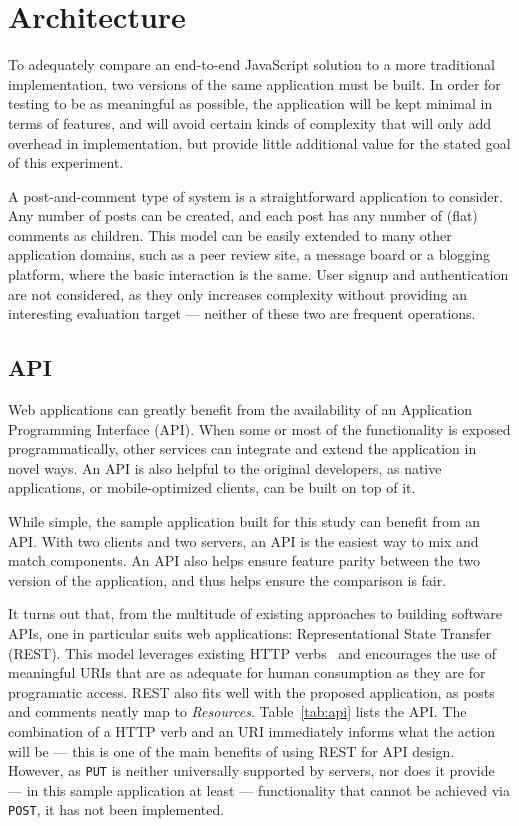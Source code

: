 \section{\label{sec:arch}Architecture}

To adequately compare an end-to-end JavaScript solution to a more traditional implementation, two versions of the same application must be built. In order for testing to be as meaningful as possible, the application will be kept minimal in terms of features, and will avoid certain kinds of complexity that will only add overhead in implementation, but provide little additional value for the stated goal of this experiment.

A post-and-comment type of system is a straightforward application to consider. Any number of posts can be created, and each post has any number of (flat) comments as children. This model can be easily extended to many other application domains, such as a peer review site, a message board or a blogging platform, where the basic interaction is the same. User signup and authentication are not considered, as they only increases complexity without providing an interesting evaluation target --- neither of these two are frequent operations.

\subsection{\label{sec:arch:API}API}

Web applications can greatly benefit from the availability of an Application Programming Interface (API). When some or most of the functionality is exposed programmatically, other services can integrate and extend the application in novel ways. An API is also helpful to the original developers, as native applications, or mobile-optimized clients, can be built on top of it.

While simple, the sample application built for this study can benefit from an API. With two clients and two servers, an API is the easiest way to mix and match components. An API also helps ensure feature parity between the two version of the application, and thus helps ensure the comparison is fair.

It turns out that, from the multitude of existing approaches to building software APIs, one in particular suits web applications: Representational State Transfer~\cite{restful} (REST). This model leverages existing HTTP verbs~\cite{rfc2616} and encourages the use of meaningful URIs that are as adequate for human consumption as they are for programatic access. REST also fits well with the proposed application, as posts and comments neatly map to \emph{Resources}. Table~\ref{tab:api} lists the API. The combination of a HTTP verb and an URI immediately informs what the action will be --- this is one of the main benefits of using REST for API design. However, as \texttt{PUT} is neither universally supported by servers, nor does it provide --- in this sample application at least --- functionality that cannot be achieved via \texttt{POST}, it has not been implemented.

